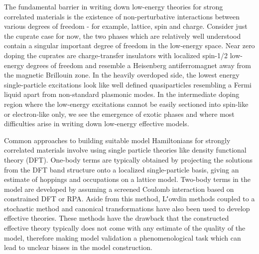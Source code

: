 \documentclass[12pt]{article}
\begin{document}
The fundamental barrier in writing down low-energy theories for strong correlated materials is the existence of non-perturbative interactions between various degrees of freedom - for example, lattice, spin and charge. 
Consider just the cuprate case for now, the two phases which are relatively well understood contain a singular important degree of freedom in the low-energy space. 
Near zero doping the cuprates are charge-transfer insulators with localized spin-1/2 low-energy degrees of freedom and resemble a Heisenberg antiferromagnet away from the magnetic Brillouin zone. 
In the heavily overdoped side, the lowest energy single-particle excitations look like well defined quasiparticles resembling a Fermi liquid apart from non-standard plasmonic modes. 
In the intermediate doping region where the low-energy excitations cannot be easily sectioned into spin-like or electron-like only, we see the emergence of exotic phases and where most difficulties arise in writing down low-energy effective models. 

Common approaches to building suitable model Hamiltonians for strongly correlated materials involve using single particle theories like density functional theory (DFT).
One-body terms are typically obtained by projecting the solutions from the DFT band structure onto a localized single-particle basis, giving an estimate of hoppings and occupations on a lattice model.
Two-body terms in the model are developed by assuming a screened Coulomb interaction based on constrained DFT or RPA.
Aside from this method, L\''{o}wdin methods coupled to a stochastic method and canonical transformations have also been used to develop effective theories.
These methods have the drawback that the constructed effective theory typically does not come with any estimate of the quality of the model, therefore making model validation a phenomenological task which can lead to unclear biases in the model construction.
\end{document}

